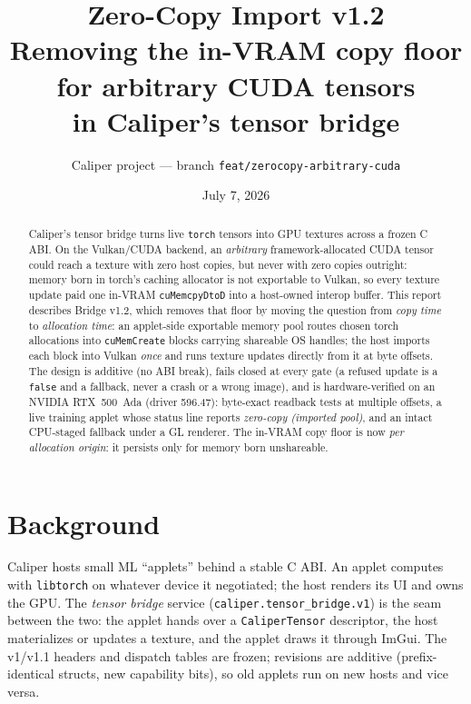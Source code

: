 \documentclass[11pt]{article}
\title{\textbf{Zero-Copy Import v1.2}\\[2pt]
\large Removing the in-VRAM copy floor for arbitrary CUDA tensors\\
in Caliper's tensor bridge}
\author{Caliper project --- branch \texttt{feat/zerocopy-arbitrary-cuda}}
\date{July 7, 2026}
\begin{document}
\maketitle

\begin{abstract}
\noindent
Caliper's tensor bridge turns live \texttt{torch} tensors into GPU textures
across a frozen C ABI. On the Vulkan/CUDA backend, an \emph{arbitrary}
framework-allocated CUDA tensor could reach a texture with zero host copies,
but never with zero copies outright: memory born in torch's caching allocator
is not exportable to Vulkan, so every texture update paid one in-VRAM
\texttt{cuMemcpyDtoD} into a host-owned interop buffer. This report describes
Bridge v1.2, which removes that floor by moving the question from
\emph{copy time} to \emph{allocation time}: an applet-side exportable memory
pool routes chosen torch allocations into \texttt{cuMemCreate} blocks carrying
shareable OS handles; the host imports each block into Vulkan \emph{once} and
runs texture updates directly from it at byte offsets. The design is additive
(no ABI break), fails closed at every gate (a refused update is a
\texttt{false} and a fallback, never a crash or a wrong image), and is
hardware-verified on an NVIDIA RTX~500~Ada (driver 596.47): byte-exact
readback tests at multiple offsets, a live training applet whose status line
reports \emph{zero-copy (imported pool)}, and an intact CPU-staged fallback
under a GL renderer. The in-VRAM copy floor is now \emph{per allocation
origin}: it persists only for memory born unshareable.
\end{abstract}

\section{Background}

Caliper hosts small ML ``applets'' behind a stable C ABI. An applet computes
with \texttt{libtorch} on whatever device it negotiated; the host renders its
UI and owns the GPU. The \emph{tensor bridge} service
(\texttt{caliper.tensor\_bridge.v1}) is the seam between the two: the applet
hands over a \texttt{CaliperTensor} descriptor, the host materializes or
updates a texture, and the applet draws it through ImGui. The v1/v1.1 headers
and dispatch tables are frozen; revisions are additive
(prefix-identical structs, new capability bits), so old applets run on new
hosts and vice versa.
\end{document}
